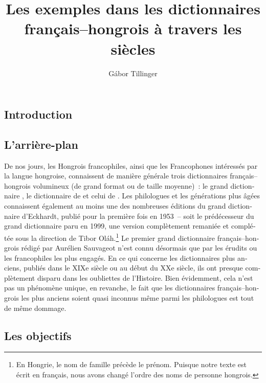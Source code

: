\documentclass[output=paper,colorlinks,citecolor=brown,arabicfont,chinesefont,booklanguage=french]{langscibook}
\author{Gábor Tillinger\affiliation{Uppsala University, Sweden}}
\title[Les exemples dans les dictionnaires français–hongrois]
      {Les exemples dans les dictionnaires français–hongrois à travers les siècles}
\begin{document}
 
\begin{otherlanguage}{french}
\maketitle

\renewcommand{\tabref}[1]{Tableau~\ref{#1}}
\section{Introduction}\label{sec:tillinger:1}

\subsection{L'arrière-plan}\label{sec:tillinger:1.1}

De nos jours, les Hongrois francophiles, ainsi que les Francophones intéressés par la langue hongroise, connaissent de manière générale trois dictionnaires français–hongrois volumineux (de grand format ou de taille moyenne)~: le grand dictionnaire \citet{EckhardtOlah1999}, le dictionnaire de \citet{Palfy1999} et celui de \citet{BardosiSzabo2007}. Les philologues et les générations plus âgées connaissent également au moins une des nombreuses éditions du grand dictionnaire d’Eckhardt, publié pour la première fois en 1953~– soit le prédécesseur du grand dictionnaire paru en 1999, une version complètement remaniée et complétée sous la direction de Tibor Oláh.\footnote{En Hongrie, le nom de famille précède le prénom. Puisque notre texte est écrit en français, nous avons changé l'ordre des noms de personne hongrois.} Le premier grand dictionnaire français–hongrois rédigé par Aurélien Sauvageot n’est connu désormais que par les érudits ou les francophiles les plus engagés. En ce qui concerne les dictionnaires plus anciens, publiés dans le XIXe siècle ou au début du XXe siècle, ils ont presque complètement disparu dans les oubliettes de l’Histoire. Bien évidemment, cela n’est pas un phénomène unique, en revanche, le fait que les dictionnaires français–hongrois les plus anciens soient quasi inconnus même parmi les philologues est tout de même dommage.

\subsection{Les objectifs}\label{sec:tillinger:1.2}


\end{otherlanguage}
\end{document}
